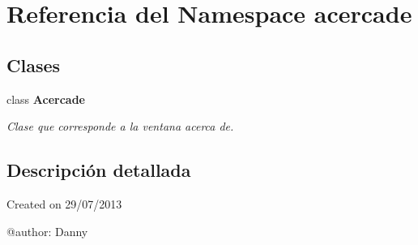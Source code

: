 \section{Referencia del Namespace acercade}
\label{namespaceacercade}
\subsection*{Clases}
\begin{DoxyCompactItemize}
\item 
class {\bf Acercade}
\begin{DoxyCompactList}\small\item\em Clase que corresponde a la ventana acerca de. \end{DoxyCompactList}\end{DoxyCompactItemize}


\subsection{Descripción detallada}
\begin{DoxyVerb}Created on 29/07/2013

@author: Danny
\end{DoxyVerb}
 
